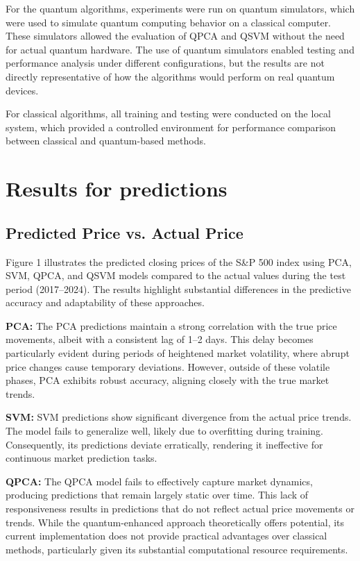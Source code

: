 \documentclass[journal]{IEEEtran}
\begin{document}
For the quantum algorithms, experiments were run on quantum simulators, which were used to simulate quantum computing behavior on a classical computer. These simulators allowed the evaluation of QPCA and QSVM without the need for actual quantum hardware. The use of quantum simulators enabled testing and performance analysis under different configurations, but the results are not directly representative of how the algorithms would perform on real quantum devices.

For classical algorithms, all training and testing were conducted on the local system, which provided a controlled environment for performance comparison between classical and quantum-based methods.

\section{Results for predictions}

\subsection{Predicted Price vs. Actual Price}

Figure 1 illustrates the predicted closing prices of the S\&P 500 index using PCA, SVM, QPCA, and QSVM models compared to the actual values during the test period (2017--2024). The results highlight substantial differences in the predictive accuracy and adaptability of these approaches.

\textbf{PCA:} The PCA predictions maintain a strong correlation with the true price movements, albeit with a consistent lag of 1--2 days. This delay becomes particularly evident during periods of heightened market volatility, where abrupt price changes cause temporary deviations. However, outside of these volatile phases, PCA exhibits robust accuracy, aligning closely with the true market trends.

\textbf{SVM:} SVM predictions show significant divergence from the actual price trends. The model fails to generalize well, likely due to overfitting during training. Consequently, its predictions deviate erratically, rendering it ineffective for continuous market prediction tasks.

\textbf{QPCA:} The QPCA model fails to effectively capture market dynamics, producing predictions that remain largely static over time. This lack of responsiveness results in predictions that do not reflect actual price movements or trends. While the quantum-enhanced approach theoretically offers potential, its current implementation does not provide practical advantages over classical methods, particularly given its substantial computational resource requirements.
\end{document}
